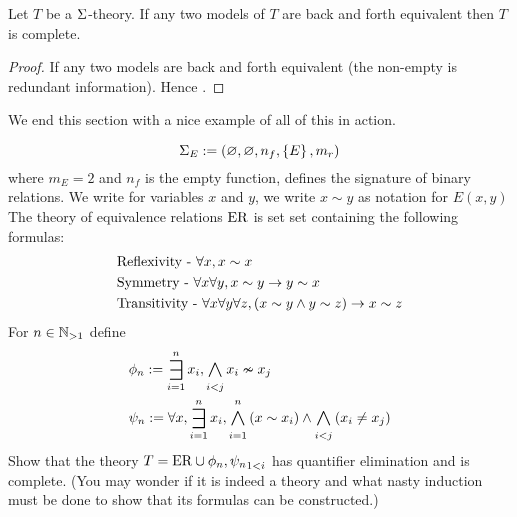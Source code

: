 \begin{cor}
    Let $T$ be a $\Sigma$-theory.
    If any two models of $T$ are back and forth equivalent then 
    $T$ is complete.
\end{cor}
\begin{proof}
    If any two models are back and forth equivalent 
     (the non-empty is redundant information).
    Hence .
\end{proof}

We end this section with a nice example of all of this in action.
\begin{eg}
    \[\Sigma_E := (\varnothing,\varnothing,n_f,\left\{E\right\},m_r)\]
    where $m_E = 2$ and $n_f$ is the empty function, 
    defines the signature of binary relations.
    We write for variables $x$ and $y$, 
    we write $x \sim y$ as notation for $E(x,y)$
    The theory of equivalence relations $\mathrm{ER}$ 
    is set set containing the following formulas:
    \begin{align*}
        &\text{Reflexivity - } \forall x, x \sim x\\
        &\text{Symmetry - } \forall x \forall y, x \sim y \to y \sim x\\
        &\text{Transitivity - } 
        \forall x \forall y \forall z, (x \sim y \land y \sim z) \to x \sim z
    \end{align*}
    For $n \in \mathbb{N}_{>1}$ define 
    \begin{align*}
        &\phi_n := \bigexists{i = 1}{n} x_i, \bigand{i < j}{} x_i \nsim x_j\\
        &\psi_n := \forall x, \bigexists{i = 1}{n} x_i, 
            \bigand{i = 1}{n} \brkt{x \sim x_i} \AND 
            \bigand{i < j}{} \brkt{x_i \ne x_j}
    \end{align*}
    Show that the theory $T = \mathrm{ER} \cup {\phi_n, \psi_n}_{1 < i}$ has 
    quantifier elimination and is complete.
    (You may wonder if it is indeed a theory
    and what nasty induction must be done to 
    show that its formulas can be constructed.)
\end{eg}
